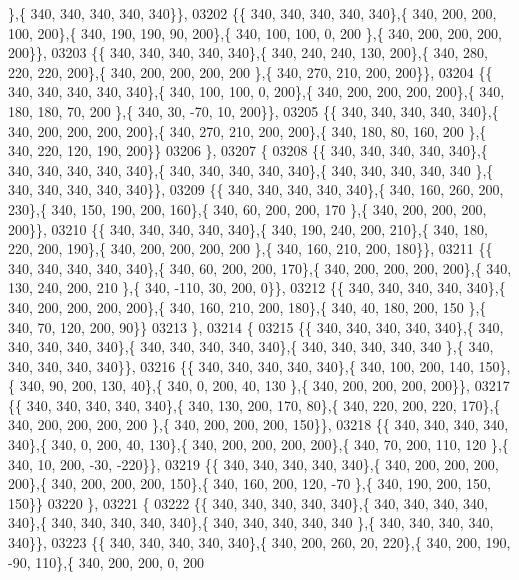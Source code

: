 \begin{DoxyCode}
      \},\{ 340, 340, 340, 340, 340\}\},
03202 \{\{ 340, 340, 340, 340, 340\},\{ 340, 200, 200, 100, 200\},\{ 340, 190, 190,  90, 200\},\{ 340, 100, 100,   0, 200
      \},\{ 340, 200, 200, 200, 200\}\},
03203 \{\{ 340, 340, 340, 340, 340\},\{ 340, 240, 240, 130, 200\},\{ 340, 280, 220, 220, 200\},\{ 340, 200, 200, 200, 200
      \},\{ 340, 270, 210, 200, 200\}\},
03204 \{\{ 340, 340, 340, 340, 340\},\{ 340, 100, 100,   0, 200\},\{ 340, 200, 200, 200, 200\},\{ 340, 180, 180,  70, 200
      \},\{ 340,  30, -70,  10, 200\}\},
03205 \{\{ 340, 340, 340, 340, 340\},\{ 340, 200, 200, 200, 200\},\{ 340, 270, 210, 200, 200\},\{ 340, 180,  80, 160, 200
      \},\{ 340, 220, 120, 190, 200\}\}
03206 \},
03207 \{
03208 \{\{ 340, 340, 340, 340, 340\},\{ 340, 340, 340, 340, 340\},\{ 340, 340, 340, 340, 340\},\{ 340, 340, 340, 340, 340
      \},\{ 340, 340, 340, 340, 340\}\},
03209 \{\{ 340, 340, 340, 340, 340\},\{ 340, 160, 260, 200, 230\},\{ 340, 150, 190, 200, 160\},\{ 340,  60, 200, 200, 170
      \},\{ 340, 200, 200, 200, 200\}\},
03210 \{\{ 340, 340, 340, 340, 340\},\{ 340, 190, 240, 200, 210\},\{ 340, 180, 220, 200, 190\},\{ 340, 200, 200, 200, 200
      \},\{ 340, 160, 210, 200, 180\}\},
03211 \{\{ 340, 340, 340, 340, 340\},\{ 340,  60, 200, 200, 170\},\{ 340, 200, 200, 200, 200\},\{ 340, 130, 240, 200, 210
      \},\{ 340, -110,  30, 200,   0\}\},
03212 \{\{ 340, 340, 340, 340, 340\},\{ 340, 200, 200, 200, 200\},\{ 340, 160, 210, 200, 180\},\{ 340,  40, 180, 200, 150
      \},\{ 340,  70, 120, 200,  90\}\}
03213 \},
03214 \{
03215 \{\{ 340, 340, 340, 340, 340\},\{ 340, 340, 340, 340, 340\},\{ 340, 340, 340, 340, 340\},\{ 340, 340, 340, 340, 340
      \},\{ 340, 340, 340, 340, 340\}\},
03216 \{\{ 340, 340, 340, 340, 340\},\{ 340, 100, 200, 140, 150\},\{ 340,  90, 200, 130,  40\},\{ 340,   0, 200,  40, 130
      \},\{ 340, 200, 200, 200, 200\}\},
03217 \{\{ 340, 340, 340, 340, 340\},\{ 340, 130, 200, 170,  80\},\{ 340, 220, 200, 220, 170\},\{ 340, 200, 200, 200, 200
      \},\{ 340, 200, 200, 200, 150\}\},
03218 \{\{ 340, 340, 340, 340, 340\},\{ 340,   0, 200,  40, 130\},\{ 340, 200, 200, 200, 200\},\{ 340,  70, 200, 110, 120
      \},\{ 340,  10, 200, -30, -220\}\},
03219 \{\{ 340, 340, 340, 340, 340\},\{ 340, 200, 200, 200, 200\},\{ 340, 200, 200, 200, 150\},\{ 340, 160, 200, 120, -70
      \},\{ 340, 190, 200, 150, 150\}\}
03220 \},
03221 \{
03222 \{\{ 340, 340, 340, 340, 340\},\{ 340, 340, 340, 340, 340\},\{ 340, 340, 340, 340, 340\},\{ 340, 340, 340, 340, 340
      \},\{ 340, 340, 340, 340, 340\}\},
03223 \{\{ 340, 340, 340, 340, 340\},\{ 340, 200, 260,  20, 220\},\{ 340, 200, 190, -90, 110\},\{ 340, 200, 200,   0, 200

\end{DoxyCode}
